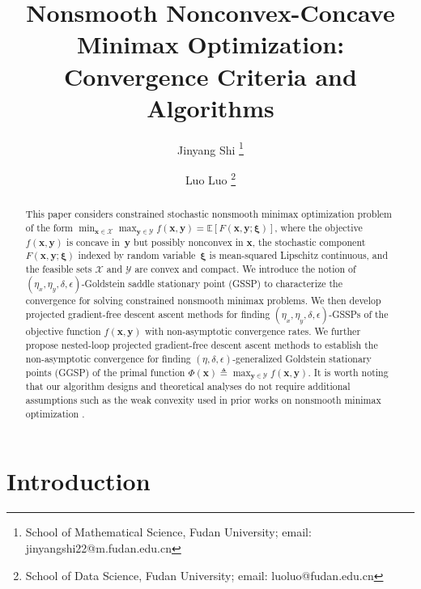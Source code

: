 \documentclass[11pt]{article}
\def\fX{{\mathcal{X}}}
\def\fY{{\mathcal{Y}}}
\begin{document}
\title{Nonsmooth Nonconvex-Concave Minimax Optimization: Convergence Criteria and Algorithms
}



\author{
Jinyang Shi
\thanks{School of Mathematical Science, Fudan University; email: jinyangshi22@m.fudan.edu.cn}
\and
Luo Luo
\thanks{School of Data Science, Fudan University; email: luoluo@fudan.edu.cn}
}


\maketitle




\begin{abstract}
This paper considers constrained stochastic nonsmooth minimax optimization problem of the form $\min_{\mathbf{x}\in\mathcal{X}}\max_{\mathbf{y}\in\mathcal{Y}}f\left(\mathbf{x},\mathbf{y}\right)=\mathbb{E}[F(\mathbf{x},\mathbf{y};\mathbf{\xi})]$, 
where the objective $f(\mathbf{x},\mathbf{y})$ is concave in~$\mathbf{y}$ but possibly nonconvex in $\mathbf{x}$, the stochastic component $F(\mathbf{x},\mathbf{y};\mathbf{\xi})$ indexed by random variable~$\mathbf{\xi}$ is mean-squared Lipschitz continuous, and the feasible sets $\fX$ and $\fY$ are convex and compact.
We introduce the notion of $(\eta_x,\eta_y,\delta,\epsilon)$-Goldstein saddle stationary point (GSSP) to characterize the convergence for solving constrained nonsmooth minimax problems. 
We then develop projected gradient-free descent ascent methods for finding $(\eta_x,\eta_y,\delta,\epsilon)$-GSSPs of the objective function $f(\mathbf{x},\mathbf{y})$ with non-asymptotic convergence rates.
We further propose nested-loop projected gradient-free descent ascent methods to establish the non-asymptotic convergence for finding $(\eta,\delta,\epsilon)$-generalized Goldstein stationary points (GGSP) \citep{liu2024zeroth} of the primal function $\Phi(\mathbf{x})\triangleq\max_{\mathbf{y}\in\mathcal{Y}}{f}\left(\mathbf{x},\mathbf{y}\right)$.
It is worth noting that our algorithm designs and theoretical analyses do not require additional assumptions such as the weak convexity used in prior works on nonsmooth minimax optimization \citep{lin2025two,boct2023alternating}.
\end{abstract}


\section{Introduction}
\end{document}
